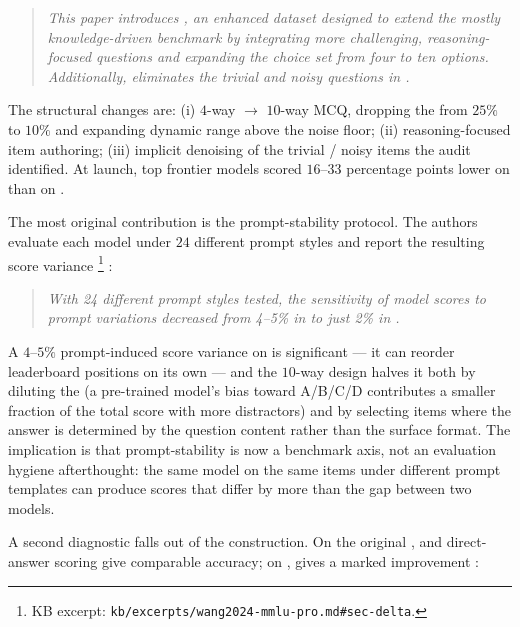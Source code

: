 \begin{quote}\itshape
This paper introduces , an enhanced dataset designed to extend
the mostly knowledge-driven  benchmark by integrating more
challenging, reasoning-focused questions and expanding the choice set
from four to ten options. Additionally,  eliminates the trivial
and noisy questions in .
\end{quote}

The structural changes are: (i) $4$-way $\to$ $10$-way MCQ, dropping
the  from $25\%$ to $10\%$ and expanding dynamic
range above the noise floor; (ii) reasoning-focused item authoring;
(iii) implicit denoising of the trivial / noisy items the
\citeauthor{mmlu-redux-2024} audit identified. At launch, top frontier
models scored $16$--$33$ percentage points lower on  than on
 \citep[\S{}sec-delta]{wang2024-mmlu-pro}.

The most original contribution is the prompt-stability protocol. The
authors evaluate each model under $24$ different prompt styles and
report the resulting score variance%
\footnote{KB excerpt: \texttt{kb/excerpts/wang2024-mmlu-pro.md\#sec-delta}.}
\citep[\S{}abstract]{wang2024-mmlu-pro}:

\begin{quote}\itshape
With 24 different prompt styles tested, the sensitivity of model
scores to prompt variations decreased from 4--5\% in  to just
2\% in .
\end{quote}

A $4$--$5\%$ prompt-induced score variance on  is significant ---
it can reorder leaderboard positions on its own --- and the $10$-way
design halves it both by diluting the  (a
pre-trained model's bias toward A/B/C/D contributes a smaller fraction
of the total score with more distractors) and by selecting items where
the answer is determined by the question content rather than the
surface format. The implication is that prompt-stability is now a
benchmark axis, not an evaluation hygiene afterthought: the same
model on the same items under different prompt templates can produce
scores that differ by more than the gap between two models.

A second diagnostic falls out of the  construction. On the
original ,  and direct-answer scoring give
comparable accuracy; on ,  gives a marked improvement
\citep[\S{}sec-cot]{wang2024-mmlu-pro}:

